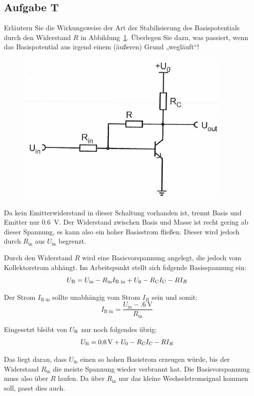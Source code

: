 \FloatBarrier
\subsection{Aufgabe T}

\begin{problem}
    Erläutern Sie die Wirkungsweise der Art der Stabilisierung des
    Basispotentials durch den Widerstand $R$ in Abbildung~\ref{fig:3_4-16}.
    Überlegen Sie dazu, was passiert, wenn das Basispotential aus irgend einem
    (äußeren) Grund „wegläuft“!
\end{problem}

\begin{figure}[htbp]
    \centering
    \includegraphics[width=.6\textwidth]{Anleitung/3_4-16.png}
    \caption{%
        \cite[Abbildung~3/4.16]{physik313-Anleitung}
    }
    \label{fig:3_4-16}
\end{figure}

Da kein Emitterwiderstand in dieser Schaltung vorhanden ist, trennt Basis und
Emitter nur \SI{.6}{\volt}. Der Widerstand zwischen Basis und Masse ist recht
gering ab dieser Spannung, es kann also ein hoher Basisstrom fließen. Dieser
wird jedoch durch $R_\text{in}$ aus $U_\text{in}$ begrenzt.

Durch den Widerstand $R$ wird eine Basisvorspannung angelegt, die jedoch vom
Kollektorstrom abhängt. Im Arbeitspunkt stellt sich folgende Basisspannung ein:
\[
    U_\text{B} = U_\text{in} - R_\text{in} I_\text{B in}
    + U_0 - R_\text{C} I_\text{C} - R I_R
\]

Der Strom $I_\text{B in}$ sollte unabhängig vom Strom $I_R$ sein und somit:
\[
    I_\text{B in} = \frac{U_\text{in} - \SI{.6}\volt}{R_\text{in}}
\]

Eingesetzt bleibt von $U_\text{B}$ nur noch folgendes übrig:
\[
    U_\text{B} = \SI{.6}\volt + U_0 - R_\text{C} I_\text{C} - R I_R
\]

Das liegt daran, dass $U_\text{in}$ einen so hohen Basistrom erzeugen würde,
bis der Widerstand $R_\text{in}$ die meiste Spannung wieder verbrannt hat. Die
Basisvorspannung muss also über $R$ laufen. Da über $R_\text{in}$ nur das
kleine Wechselstromsignal kommen soll, passt dies auch.

